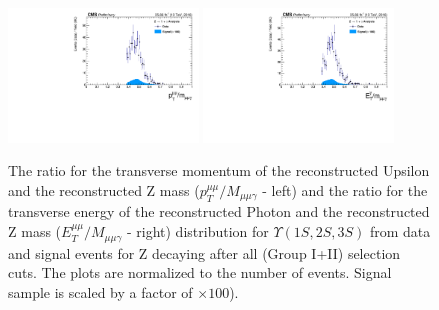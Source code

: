 \begin{figure}[!htbp]
\begin{center}
\includegraphics[width=0.45\textwidth]{figures/outputPlots/ZtoUpsilon_Cat0_ZZZZZ/nEvts/data_x_mc/withKinCuts/h_withKin_upsilonPt_over_zMass}\hspace*{1.cm}
\includegraphics[width=0.45\textwidth]{figures/outputPlots/ZtoUpsilon_Cat0_ZZZZZ/nEvts/data_x_mc/withKinCuts/h_withKin_photonPt_over_zMass}
\end{center}\vspace*{-.5cm}
\caption{The ratio for the transverse momentum of the reconstructed Upsilon and the reconstructed Z mass ($p_{T}^{\mu\mu}/M_{\mu\mu\gamma}$ - left) and the ratio for the transverse energy of the reconstructed Photon and the reconstructed Z mass ($E_{T}^{\mu\mu}/M_{\mu\mu\gamma}$ - right) distribution for $\Upsilon(1S,2S,3S)$ from data and signal events for Z decaying after all (Group I+II) selection cuts. The plots are normalized to the number of events. Signal sample is scaled by a factor of $\times 100$).}
\label{fig:energy_ration_ZtoUpsilon_Cat0_groupI_plus_II}
\end{figure}


